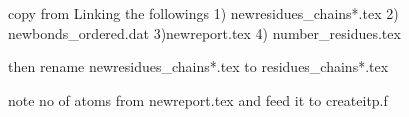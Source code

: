 
copy from Linking the followings 1) newresidues_chains*.tex 2) newbonds_ordered.dat 3)newreport.tex 4) number_residues.tex  

then rename newresidues_chains*.tex to residues_chains*.tex 

note no of atoms from newreport.tex and feed it to createitp.f
